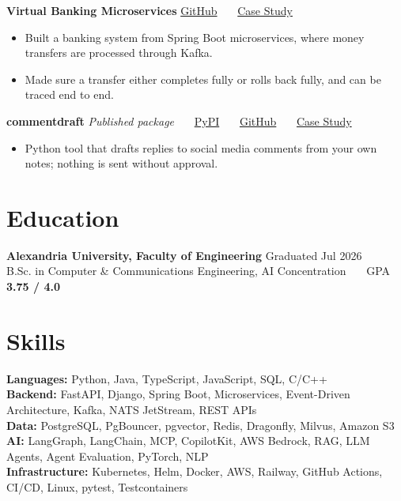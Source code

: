 \documentclass[10pt,a4paper]{article}
\newcommand{\project}[2]{\textbf{#1} \hfill {\small #2}}
\newcommand{\gap}{\vspace{3.5pt}}
\newcommand{\sep}{\ \textbar\ \ }
\begin{document}
\gap
\project{Virtual Banking Microservices}{\href{https://github.com/Ab-Romia/Virtual-Bank-System}{GitHub} \sep \href{https://romia.dev/projects/virtual-banking}{Case Study}}
\begin{itemize}
\item Built a banking system from Spring Boot microservices, where money transfers are processed through Kafka.
\item Made sure a transfer either completes fully or rolls back fully, and can be traced end to end.
\end{itemize}

\gap
\project{commentdraft}{\textit{Published package} \sep \href{https://pypi.org/project/commentdraft/}{PyPI} \sep \href{https://github.com/Ab-Romia/commentdraft}{GitHub} \sep \href{https://romia.dev/projects/commentdraft}{Case Study}}
\begin{itemize}
\item Python tool that drafts replies to social media comments from your own notes; nothing is sent without approval.
\end{itemize}

\section{Education}
\textbf{Alexandria University, Faculty of Engineering} \hfill {\small\color{mutedcolor}Graduated Jul 2026}\\
B.Sc. in Computer \& Communications Engineering, AI Concentration \sep GPA \textbf{3.75 / 4.0}

\section{Skills}
\textbf{Languages:} Python, Java, TypeScript, JavaScript, SQL, C/C++ \\[2pt]
\textbf{Backend:} FastAPI, Django, Spring Boot, Microservices, Event-Driven Architecture, Kafka, NATS JetStream, REST APIs \\[2pt]
\textbf{Data:} PostgreSQL, PgBouncer, pgvector, Redis, Dragonfly, Milvus, Amazon S3 \\[2pt]
\textbf{AI:} LangGraph, LangChain, MCP, CopilotKit, AWS Bedrock, RAG, LLM Agents, Agent Evaluation, PyTorch, NLP \\[2pt]
\textbf{Infrastructure:} Kubernetes, Helm, Docker, AWS, Railway, GitHub Actions, CI/CD, Linux, pytest, Testcontainers
\end{document}
